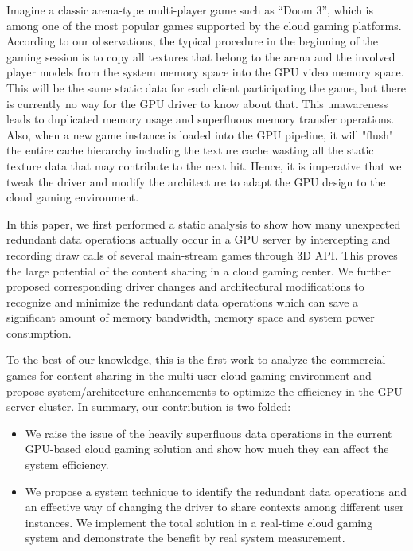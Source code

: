 \documentclass[pageno]{jpaper}
\begin{document}
Imagine a classic arena-type multi-player game such as ``Doom 3'', which is among one of the most popular games supported by the cloud gaming platforms. According to our observations, the typical procedure in the beginning of the gaming session is to copy all textures that belong to the arena and the involved player models from the system memory space into the GPU video memory space. This will be the same static data for each client participating the game, but there is currently no way for the GPU driver to know about that. This unawareness leads to duplicated memory usage and superfluous memory transfer operations. Also, when a new game instance is loaded into the GPU pipeline, it will "flush" the entire cache hierarchy including the texture cache wasting all the static texture data that may contribute to the next hit. Hence, it is imperative that we tweak the driver and modify the architecture to adapt the GPU design to the cloud gaming environment.

In this paper, we first performed a static analysis to show how many unexpected redundant data operations actually occur in a GPU server by intercepting and recording draw calls of several main-stream games through 3D API. This proves the large potential of the content sharing in a cloud gaming center. We further proposed corresponding driver changes and architectural modifications to recognize and minimize the redundant data operations which can save a significant amount of memory bandwidth, memory space and system power consumption.

To the best of our knowledge, this is the first work to analyze the commercial games for content sharing in the multi-user cloud gaming environment and propose system/architecture enhancements to optimize the efficiency in the GPU server cluster. In summary, our contribution is two-folded:

\begin{itemize}


\item {We raise the issue of the heavily superfluous data operations in the current GPU-based cloud gaming solution and show how much they can affect the system efficiency.}
\item {We propose a system technique to identify the redundant data operations and an effective way of changing the driver to share contexts among different user instances. We implement the total solution in a real-time cloud gaming system and demonstrate the benefit by real system measurement.}

\end{itemize}
\end{document}
